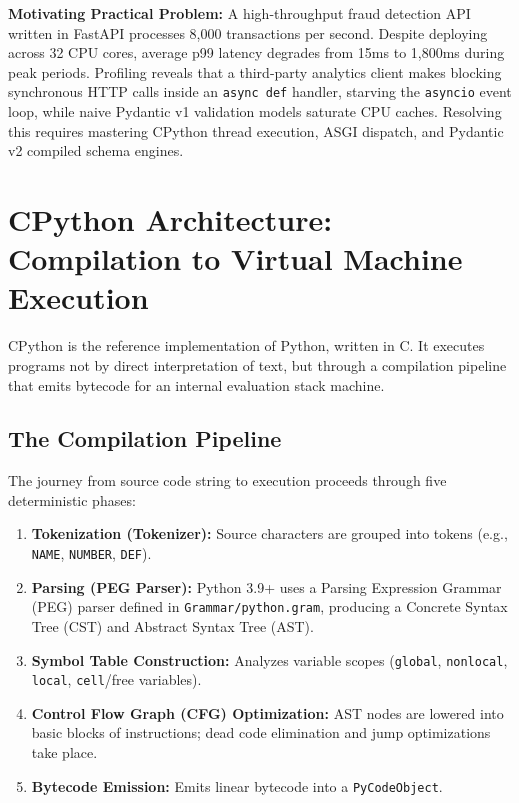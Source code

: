 \begin{chaptergoalsbox}
\textbf{Motivating Practical Problem:}
A high-throughput fraud detection API written in FastAPI processes 8,000 transactions per second. Despite deploying across 32 CPU cores, average p99 latency degrades from 15ms to 1,800ms during peak periods. Profiling reveals that a third-party analytics client makes blocking synchronous HTTP calls inside an \texttt{async def} handler, starving the \texttt{asyncio} event loop, while naive Pydantic v1 validation models saturate CPU caches. Resolving this requires mastering CPython thread execution, ASGI dispatch, and Pydantic v2 compiled schema engines.
\end{chaptergoalsbox}

\section{CPython Architecture: Compilation to Virtual Machine Execution}

CPython is the reference implementation of Python, written in C. It executes programs not by direct interpretation of text, but through a compilation pipeline that emits bytecode for an internal evaluation stack machine.

\subsection{The Compilation Pipeline}

The journey from source code string to execution proceeds through five deterministic phases:
\begin{enumerate}[leftmargin=15pt]
  \item \textbf{Tokenization (Tokenizer):} Source characters are grouped into tokens (e.g., \texttt{NAME}, \texttt{NUMBER}, \texttt{DEF}).
  \item \textbf{Parsing (PEG Parser):} Python 3.9+ uses a Parsing Expression Grammar (PEG) parser defined in \texttt{Grammar/python.gram}, producing a Concrete Syntax Tree (CST) and Abstract Syntax Tree (AST).
  \item \textbf{Symbol Table Construction:} Analyzes variable scopes (\texttt{global}, \texttt{nonlocal}, \texttt{local}, \texttt{cell}/free variables).
  \item \textbf{Control Flow Graph (CFG) Optimization:} AST nodes are lowered into basic blocks of instructions; dead code elimination and jump optimizations take place.
  \item \textbf{Bytecode Emission:} Emits linear bytecode into a \texttt{PyCodeObject}.
\end{enumerate}

